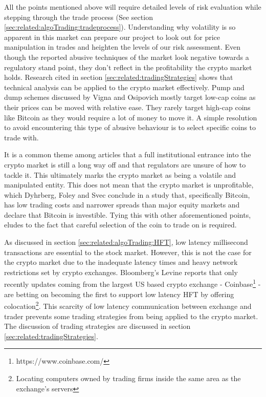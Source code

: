 All the points mentioned above will require detailed levels of risk evaluation while stepping through the trade process (See section \ref{sec:related:algoTrading:tradeprocess}). Understanding why volatility is so apparent in this market can prepare our project to look out for price manipulation in trades and heighten the levels of our risk assessment. Even though the reported abusive techniques of the market look negative towards a regulatory stand point, they don't reflect in the profitability the crypto market holds. Research cited in section \ref{sec:related:tradingStrategies} shows that technical analysis can be applied to the crypto market effectively. Pump and dump schemes discussed by Vigna and Osipovich mostly target low-cap coins as their prices can be moved with relative ease. They rarely target high-cap coins like Bitcoin as they would require a lot of money to move it. A simple resolution to avoid encountering this type of abusive behaviour is to select specific coins to trade with.  

It is a common theme among articles that a full institutional entrance into the crypto market is still a long way off and that regulators are unsure of how to tackle it. This ultimately marks the crypto market as being a volatile and manipulated entity. This does not mean that the crypto market is unprofitable, which Dyhrberg, Foley and Svec conclude in a study that, specifically Bitcoin, has low trading costs and narrower spreads than major equity markets and declare that Bitcoin is investible. Tying this with other aforementioned points, eludes to the fact that careful selection of the coin to trade on is required.  

As discussed in section \ref{sec:related:algoTrading:HFT}, low latency millisecond transactions are essential to the stock market. However, this is not the case for the crypto market due to the inadequate latency times and heavy network restrictions set by crypto exchanges. Bloomberg's Levine reports \cite{WEB:Levine:2018} that only recently updates coming from the largest US based crypto exchange - Coinbase\footnote{https://www.coinbase.com/} - are betting on becoming the first to support low latency HFT by offering colocation\footnote{Locating computers owned by trading firms inside the same area as the exchange's servers}. This scarcity of low latency communication between exchange and trader prevents some trading strategies from being applied to the crypto market. The discussion of trading strategies are discussed in section \ref{sec:related:tradingStrategies}.

